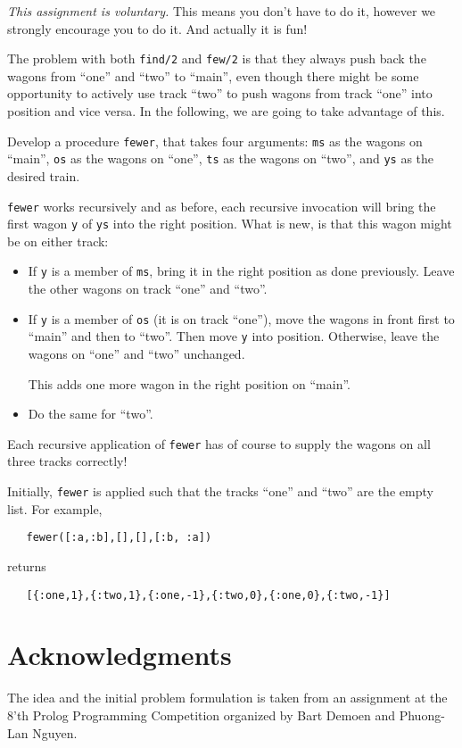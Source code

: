 \documentclass[a4paper,11pt]{article}
\begin{document}
\emph{This assignment is voluntary.} This means you don't have to
do it, however we strongly encourage you to do it. And actually
it is fun!

The problem with both \verb+find/2+ and \verb+few/2+ is that they
always push back the wagons from ``one'' and ``two'' to ``main'',
even though there might be some opportunity to actively use track
``two'' to push wagons from track ``one'' into position and vice
versa. In the following, we are going to take advantage of this.

Develop a procedure \verb+fewer+, that takes four arguments:
\verb+ms+ as the wagons on ``main'', \verb+os+ as the wagons on ``one'',
\verb+ts+ as the wagons on ``two'', and \verb+ys+ as the desired train.

\verb+fewer+ works recursively and as before, each recursive
invocation will bring the first wagon \verb+y+ of \verb+ys+ into the right
position. What is new, is that this wagon might be on either
track:
\begin{itemize}
\item If \verb+y+ is a member of \verb+ms+, bring it in the right
  position as done previously. Leave the other wagons on track
  ``one'' and ``two''.
\item If \verb+y+ is a member of \verb+os+ (it is on track ``one''), move
  the wagons in front first to ``main'' and then to ``two''. Then
  move \verb+y+ into position. Otherwise, leave the wagons on ``one''
  and ``two'' unchanged.

  This adds one more wagon in the right position on ``main''.
\item Do the same for ``two''.
\end{itemize}

Each recursive application of \verb+fewer+ has of course to
supply the wagons on all three tracks correctly!

Initially, \verb+fewer+ is applied such that the tracks ``one''
and ``two'' are the empty list. For example,
\begin{verbatim}
   fewer([:a,:b],[],[],[:b, :a])
\end{verbatim}
returns
\begin{verbatim}
   [{:one,1},{:two,1},{:one,-1},{:two,0},{:one,0},{:two,-1}]
\end{verbatim}

\section{Acknowledgments}

The idea and the initial problem formulation is taken from an
assignment at the 8'th Prolog Programming Competition organized by Bart
Demoen and Phuong-Lan Nguyen. 
\end{document}
